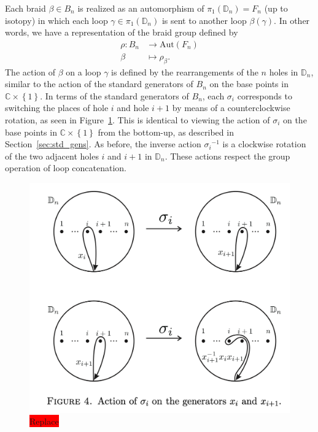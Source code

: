 \documentclass[12pt]{report}
\newcommand{\C}{\mathbb{C}}
\newcommand{\D}{\mathbb{D}}
\newcommand{\iv}[1]{{ #1 }^{-1}}
\newcommand{\aut}[1]{\textrm{Aut}\!\left( #1 \right)}
\theoremstyle{definition}
\begin{document}
Each braid $\beta\in B_n$ is realized as an automorphism of $\pi_1(\D_n) = F_n$ (up to isotopy) in which each loop $\gamma\in\pi_1(\D_n)$ is sent to another loop $\beta(\gamma)$. In other words, we have a representation of the braid group defined by
\begin{align}
    \rho: B_n &\to \aut{F_n} \\
    \beta &\mapsto \rho_\beta.
\end{align}
The action of $\beta$ on a loop $\gamma$ is defined by the rearrangements of the $n$ holes in $\D_n$, similar to the action of the standard generators of $B_n$ on the base points in $\C\times\left\{ 1 \right\}$. In terms of the standard generators of $B_n$, each $\sigma_i$ corresponds to switching the places of hole $i$ and hole $i+1$ by means of a counterclockwise rotation, as seen in Figure~\ref{fig:sigma_on_Dn}. This is identical to viewing the action of $\sigma_i$ on the base points in $\C\times\left\{ 1 \right\}$ from the bottom-up, as described in Section~\ref{sec:std_gens}. As before, the inverse action $\iv{\sigma_i}$ is a clockwise rotation of the two adjacent holes $i$ and $i+1$ in $\D_n$. These actions respect the group operation of loop concatenation.

\begin{figure}[htbp]
    \centering
    \includegraphics[width = .5\textwidth]{Gonzalez_Fig4_sigma_on_Dn.png}
    \caption{\colorbox{red}{Replace}}\label{fig:sigma_on_Dn}
\end{figure}
\end{document}
